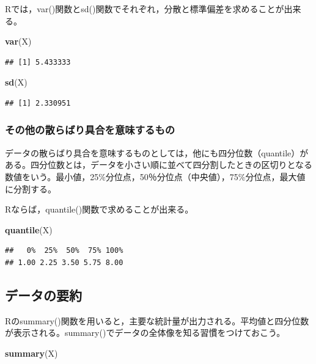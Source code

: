 \documentclass[]{article}
\newenvironment{Shaded}{\begin{snugshade}}{\end{snugshade}}
\newcommand{\KeywordTok}[1]{\textcolor[rgb]{0.13,0.29,0.53}{\textbf{#1}}}
\newcommand{\NormalTok}[1]{#1}
\begin{document}
Rでは，var()関数とsd()関数でそれぞれ，分散と標準偏差を求めることが出来る。

\begin{Shaded}
\begin{Highlighting}[]
\KeywordTok{var}\NormalTok{(X)}
\end{Highlighting}
\end{Shaded}

\begin{verbatim}
## [1] 5.433333
\end{verbatim}

\begin{Shaded}
\begin{Highlighting}[]
\KeywordTok{sd}\NormalTok{(X)}
\end{Highlighting}
\end{Shaded}

\begin{verbatim}
## [1] 2.330951
\end{verbatim}

\subsubsection{その他の散らばり具合を意味するもの}

データの散らばり具合を意味するものとしては，他にも四分位数（quantile）がある。四分位数とは，データを小さい順に並べて四分割したときの区切りとなる数値をいう。最小値，25\%分位点，50％分位点（中央値），75\%分位点，最大値に分割する。

Rならば，quantile()関数で求めることが出来る。

\begin{Shaded}
\begin{Highlighting}[]
\KeywordTok{quantile}\NormalTok{(X)}
\end{Highlighting}
\end{Shaded}

\begin{verbatim}
##   0%  25%  50%  75% 100% 
## 1.00 2.25 3.50 5.75 8.00
\end{verbatim}

\subsection{データの要約}

Rのsummary()関数を用いると，主要な統計量が出力される。平均値と四分位数が表示される。summary()でデータの全体像を知る習慣をつけておこう。

\begin{Shaded}
\begin{Highlighting}[]
\KeywordTok{summary}\NormalTok{(X)}
\end{Highlighting}
\end{Shaded}
\end{document}
